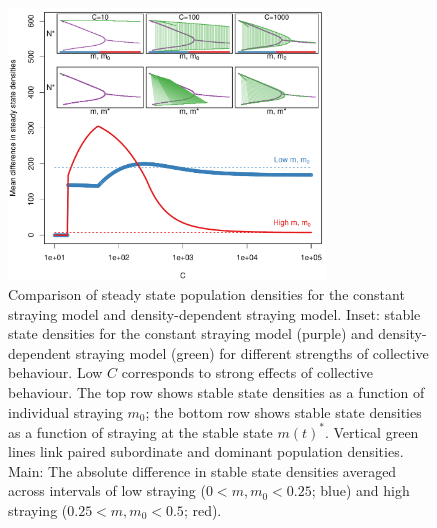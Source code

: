 \documentclass{revtex4}
\begin{document}
\begin{figure}
  \captionsetup{justification=raggedright,
singlelinecheck=false
}
\centering
\includegraphics[width=0.75\textwidth]{fig_meandiff2.pdf}
\caption{
Comparison of steady state population densities for the constant straying model and density-dependent straying model.
Inset: stable state densities for the constant straying model (purple) and density-dependent straying model (green) for different strengths of collective behaviour.
Low $C$ corresponds to strong effects of collective behaviour.
The top row shows stable state densities as a function of individual straying $m_0$; the bottom row shows stable state densities as a function of straying at the stable state $m(t)^*$.
Vertical green lines link paired subordinate and dominant population densities.
Main: The absolute difference in stable state densities averaged across intervals of low straying ($0 < m,m_0 < 0.25$; blue) and high straying ($0.25 < m,m_0 < 0.5$; red).
} \label{fig:cb}
\end{figure}
\end{document}
